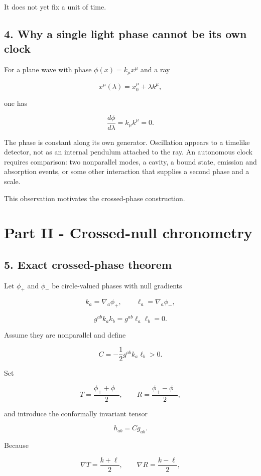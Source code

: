 \documentclass[
]{article}
\begin{document}
It does not yet fix a unit of time.

\subsection{4. Why a single light phase cannot be its own
clock}\label{why-a-single-light-phase-cannot-be-its-own-clock}

For a plane wave with phase \(\phi(x)=k_\mu x^\mu\) and a ray

\[
x^\mu(\lambda)=x_0^\mu+\lambda k^\mu,
\]

one has

\[
\frac{d\phi}{d\lambda}=k_\mu k^\mu=0.
\]

The phase is constant along its own generator. Oscillation appears to a
timelike detector, not as an internal pendulum attached to the ray. An
autonomous clock requires comparison: two nonparallel modes, a cavity, a
bound state, emission and absorption events, or some other interaction
that supplies a second phase and a scale.

This observation motivates the crossed-phase construction.

\section{Part II - Crossed-null
chronometry}\label{part-ii---crossed-null-chronometry}

\subsection{5. Exact crossed-phase
theorem}\label{exact-crossed-phase-theorem}

Let \(\phi_+\) and \(\phi_-\) be circle-valued phases with null
gradients

\[
k_a=\nabla_a\phi_+,
\qquad
\ell_a=\nabla_a\phi_-,
\]

\[
g^{ab}k_ak_b=g^{ab}\ell_a\ell_b=0.
\]

Assume they are nonparallel and define

\[
C=-\frac12g^{ab}k_a\ell_b>0.
\]

Set

\[
T=\frac{\phi_++\phi_-}{2},
\qquad
R=\frac{\phi_+-\phi_-}{2},
\]

and introduce the conformally invariant tensor

\[
h_{ab}=C g_{ab}.
\]

Because

\[
\nabla T=\frac{k+\ell}{2},
\qquad
\nabla R=\frac{k-\ell}{2},
\]
\end{document}
